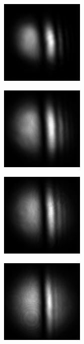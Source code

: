 \begin{figure}[ht]
\begin{subfigure}[b]{4cm}
  \end{subfigure}
  \begin{subfigure}[b]{4cm}
    \includegraphics[width=4cm,keepaspectratio]{interference/figures/move/123-7.png}
    \caption{}
  \end{subfigure}
  \begin{subfigure}[b]{4cm}
    \includegraphics[width=4cm,keepaspectratio]{interference/figures/move/123-5.png}
    \caption{}
  \end{subfigure}
  \begin{subfigure}[b]{4cm}
    \includegraphics[width=4cm,keepaspectratio]{interference/figures/move/123-3.png}
    \caption{}
  \end{subfigure}
  \begin{subfigure}[b]{4cm}
    \includegraphics[width=4cm,keepaspectratio]{interference/figures/move/123-2.png}
    \caption{}
  \end{subfigure}

\end{figure}
